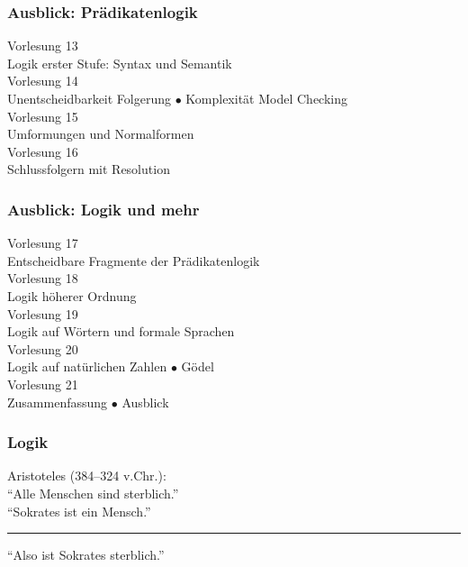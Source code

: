 \documentclass[onlymath]{beamer}
\begin{document}
\begin{frame}\frametitle{Ausblick: Prädikatenlogik}

\begin{center}
\alert{Vorlesung 13}\\
Logik erster Stufe: Syntax und Semantik\\[1ex]
\alert{Vorlesung 14}\\
Unentscheidbarkeit Folgerung $\bullet$ Komplexität Model Checking \\[1ex]
\alert{Vorlesung 15}\\
Umformungen und Normalformen \\[1ex]
\alert{Vorlesung 16}\\
Schlussfolgern mit Resolution
\end{center}

\end{frame}

\begin{frame}\frametitle{Ausblick: Logik und mehr}

\begin{center}
\alert{Vorlesung 17}\\
Entscheidbare Fragmente der Prädikatenlogik\\[1ex]
\alert{Vorlesung 18}\\
Logik höherer Ordnung \\[1ex]
\alert{Vorlesung 19}\\
Logik auf Wörtern und formale Sprachen \\[1ex]
\alert{Vorlesung 20}\\
Logik auf natürlichen Zahlen $\bullet$ Gödel\\[1ex]
\alert{Vorlesung 21}\\
Zusammenfassung $\bullet$ Ausblick
\end{center}

\end{frame}


\begin{frame}\frametitle{Logik}

\begin{center}
Aristoteles (384--324 v.Chr.):\\[1cm]

"`Alle Menschen sind sterblich."'\\
"`Sokrates ist ein Mensch."'\\
\rule{7cm}{1pt}

"`Also ist Sokrates sterblich."'

\end{center}

\end{frame}
\end{document}
